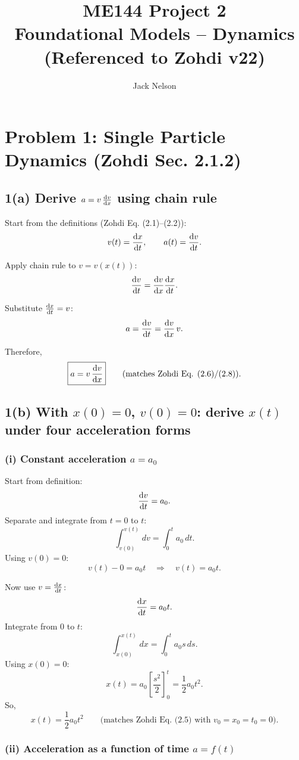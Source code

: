 \documentclass[12pt]{article}
\title{ME144 Project 2 \\ Foundational Models -- Dynamics \\ (Referenced to Zohdi v22)}
\author{Jack Nelson}
\date{}
\begin{document}
\maketitle

\newpage
\section*{Problem 1: Single Particle Dynamics (Zohdi Sec. 2.1.2)}

\subsection*{1(a) Derive $a = v\,\dv{v}{x}$ using chain rule}

Start from the definitions (Zohdi Eq. (2.1)--(2.2)):
\[
v(t) = \dv{x}{t}, \qquad a(t) = \dv{v}{t}.
\]

Apply chain rule to $v=v(x(t))$:
\[
\dv{v}{t} = \dv{v}{x}\dv{x}{t}.
\]

Substitute $\dv{x}{t}=v$:
\[
a = \dv{v}{t} = \dv{v}{x}\,v.
\]

Therefore,
\[
\boxed{a = v\,\dv{v}{x}} \qquad \text{(matches Zohdi Eq. (2.6)/(2.8)).}
\]

\subsection*{1(b) With $x(0)=0$, $v(0)=0$: derive $x(t)$ under four acceleration forms}

\subsubsection*{(i) Constant acceleration $a=a_0$}

Start from definition:
\[
\dv{v}{t} = a_0.
\]
Separate and integrate from $t=0$ to $t$:
\[
\int_{v(0)}^{v(t)} dv = \int_0^{t} a_0\,dt.
\]
Using $v(0)=0$:
\[
v(t) - 0 = a_0 t \quad \Rightarrow \quad \boxed{v(t)=a_0 t}.
\]

Now use $v=\dv{x}{t}$:
\[
\dv{x}{t} = a_0 t.
\]
Integrate from $0$ to $t$:
\[
\int_{x(0)}^{x(t)} dx = \int_0^{t} a_0 s\,ds.
\]
Using $x(0)=0$:
\[
x(t) = a_0\left[\frac{s^2}{2}\right]_{0}^{t}
      = \frac12 a_0 t^2.
\]
So,
\[
\boxed{x(t)=\frac12 a_0 t^2} \qquad \text{(matches Zohdi Eq. (2.5) with $v_0=x_0=t_0=0$).}
\]

\newpage
\subsubsection*{(ii) Acceleration as a function of time $a=f(t)$}
\end{document}
